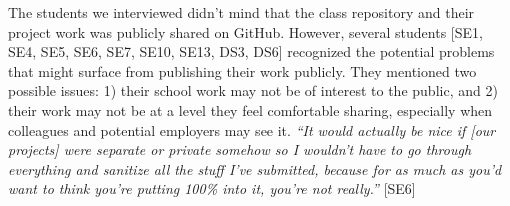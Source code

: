 The students we interviewed didn't mind that the class repository and their project work was publicly shared on GitHub. However, several students [SE1, SE4, SE5, SE6, SE7, SE10, SE13, DS3, DS6] recognized the potential problems that might surface from publishing their work publicly. They mentioned two possible issues: 1) their school work may not be of interest to the public, and 2) their work may not be at a level they feel comfortable sharing, especially when colleagues and potential employers may see it.
\textit{``It would actually be nice if [our projects] were separate or private somehow so I wouldn't have to go through everything and sanitize all the stuff I've submitted, because for as much as you'd want to think you're putting 100\% into it, you're not really.''} [SE6]



